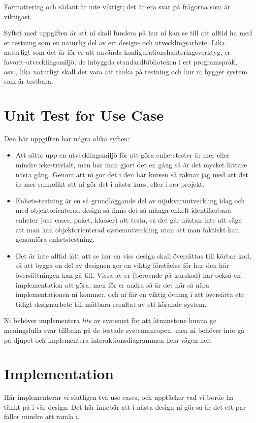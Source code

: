 \documentclass[8pt,oneside]{memoir}
\begin{document}
Formattering och sådant är inte viktigt; det är era svar på frågorna som är viktigast.

Syftet med uppgiften är att ni skall fundera på hur ni kan se till att alltid ha med er testning som en naturlig del av ert design- och utvecklingsarbete. Lika naturligt som det är för er att använda konfigurationshanteringsverktyg, er favorit-utvecklingsmiljö, de inbyggda standardbiblioteken i ert programspråk, osv., lika naturligt skall det vara att tänka på testning och hur ni bygger system som är testbara.
\chapter{Unit Test for Use Case}
\label{sec:orga01704e}
Den här uppgiften har några olika syften:

\begin{itemize}
\item Att sätta upp en utvecklingsmiljö för att göra enhetstester är mer eller mindre icke-trivialt, men har man gjort det en gång så är det mycket lättare nästa gång. Genom att ni gör det i den här kursen så räknar jag med att det är mer sannolikt att ni gör det i nästa kurs, eller i era projekt.
\item Enhets-testning är en så grundläggande del av mjukvaruutveckling idag och med objektorienterad design så finns det så många enkelt identifierbara enheter (use cases, paket, klasser) att testa, så det går nästan inte att säga att man kan objektorienterad systemutveckling utan att man faktiskt kan genomföra enhetstestning.
\item Det är inte alltid lätt att se hur en viss design skall översättas till körbar kod, så att bygga en del av designen ger en viktig förståelse för hur den här översättningen kan gå till. Vissa av er (beroende på kurskod) har också en implementation att göra, men för er andra så är det här så nära implementationen ni kommer, och ni får en viktig övning i att översätta ett tidigt designarbete till mätbara resultat av ett körande system.
\end{itemize}

Ni behöver implementera \emph{lite} av systemet för att åtminstone kunna ge meningsfulla svar tillbaka på de testade systemanropen, men ni behöver inte gå på djupet och implementera interaktionsdiagrammen hela vägen ner.
\chapter{Implementation}
\label{sec:org434887f}
Här implementerar vi slutligen två use cases, och upptäcker vad vi borde ha tänkt på i vår design. Det här innebär att i nästa design ni gör så är det ett par fällor mindre att ramla i.
\end{document}
